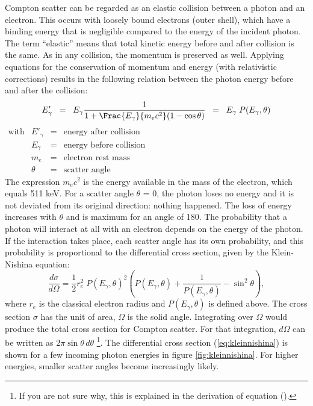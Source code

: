 Compton scatter can be regarded as an elastic collision between a
photon and an electron. This occurs with loosely bound electrons
(outer shell), which have a binding energy that is negligible compared
to the energy of the incident photon. The term ``elastic'' means that
total kinetic energy before and after collision is the same. As in any
collision, the momentum is preserved as well. Applying equations for
the conservation of momentum and energy (with relativistic
corrections) results in the following relation between the photon
energy before and after the collision:
\begin{equation}
  E'_\gamma \;\;=\;\; E_\gamma \frac{1}{1 
     + \Frac{E_\gamma}{m_e c^2} (1 - \cos\theta)} \label{eq:jn_compton_energy}
   \;\; = \;\; E_\gamma \; P(E_\gamma, \theta)
\end{equation}
%
$\begin{array}{llrl}
\mbox{with}
            & E'_\gamma & = & \mbox{energy after collision}\\
            & E_\gamma  & = & \mbox{energy before collision}\\
            & m_e       & = & \mbox{electron rest mass}\\
            & \theta    & = & \mbox{scatter angle}
\end{array}$\\
%
The expression $m_e c^2$ is the energy available in the mass of the
electron, which equals 511 keV. For a scatter angle $\theta$ = 0, the
photon loses no energy and it is not deviated from its original
direction: nothing happened.  The loss of energy increases with
$\theta$ and is maximum for an angle of 180\degrees. The probability
that a photon will interact at all with an electron depends on the
energy of the photon. If the interaction takes place, each scatter
angle has its own probability, and this probability is proportional to
the differential cross section, given by the Klein-Nishina equation:
\begin{equation}
 \frac{d\sigma}{d\Omega} = \frac{1}{2} r_e^2 \; P(E_\gamma, \theta)^2
    \left( P(E_\gamma, \theta) + \frac{1}{P(E_\gamma, \theta)} - \sin^2\theta \right),
    \label{eq:kleinnishina}
\end{equation}
where $r_e$ is the classical electron radius and $P(E_\gamma, \theta)$
is defined above. The cross section $\sigma$ has the unit of area,
$\Omega$ is the solid angle. Integrating over $\Omega$
would produce the total cross section for Compton scatter. For that
integration, $d\Omega$ can be written as $2 \pi \sin\theta \,d\theta$
\footnote{If you are not sure why, this is explained in the derivation
  of equation ().}.
The differential cross section (\ref{eq:kleinnishina}) is shown for a
few incoming photon energies in figure \ref{fig:kleinnishina}. For
higher energies, smaller scatter angles become increasingly likely.

